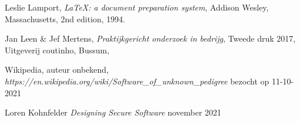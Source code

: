 
\cleardoublepage %
%
\cleardoublepage %
%
\cleardoublepage %

\begin{thebibliography}{4}

    Leslie Lamport,
    \textit{\LaTeX: a document preparation system},
    Addison Wesley, Massachusetts,
    2nd edition,
    1994.

    Jan Leen & Jef Mertens,
    \textit{Praktijkgericht onderzoek in bedrijg},
    Tweede druk 2017,
    Uitgeverij coutinho, Bussum,

    Wikipedia, auteur onbekend,
    \textit{https://en.wikipedia.org/wiki/Software\_of\_unknown\_pedigree}
    bezocht op 11-10-2021

    Loren Kohnfelder
    \textit{Designing Secure Software}
    november 2021

\end{thebibliography}



